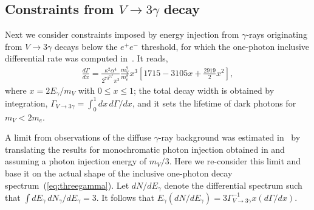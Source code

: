 \documentclass[prd,reprint,nofootinbib,notitlepage,aps,tightenlines,preprintnumbers,amsmath,amssymb,showpacs,superscriptaddress]{revtex4-1}
\begin{document}
\subsection{Constraints from $V\to 3\gamma$ decay}
\label{sec:constraints-from-vto}


Next we consider constraints imposed by energy injection from
$\gamma$-rays originating from $V\to 3\gamma$ decays below the
$e^+e^-$ threshold, for which the one-photon inclusive differential
rate was computed in~\cite{Pospelov:2008jk}. It reads,
%
\begin{align}
\label{eq:threegamma}
  \frac{d\Gamma}{dx} = \frac{\kappa^2\alpha^4}{2^73^75^3\pi^3}
 \frac{m_V^9}{m_e^8} x^3 \left[ 1715 - 3105x + \frac{2919}{2} x^2 \right],
\end{align}
%
where $x = 2 E_{\gamma}/m_V$ with $0\leq x \leq 1$; the total decay
width is obtained by integration,
$\Gamma_{V\to 3\gamma} = \int_0^1 dx\, d\Gamma/dx$, and it sets the
lifetime of dark photons for $m_V < 2m_e$. 

A limit from observations of the diffuse $\gamma$-ray background was
estimated in~\cite{Redondo:2008ec} by translating the results for
monochromatic photon injection obtained in \cite{Yuksel:2007dr} and
assuming a photon injection energy of $m_V/3$. Here we re-consider
this limit and base it on the actual shape of the inclusive one-photon
decay spectrum~(\ref{eq:threegamma}). Let $dN/dE_{\gamma}$ denote the
differential spectrum such that
$\int dE_{\gamma} \, dN_{\gamma}/dE_{\gamma} = 3$. It follows that
$E_{\gamma} (dN/dE_{\gamma}) = 3 \Gamma_{V\to 3\gamma}^{-1} x
(d\Gamma/dx )$.
\end{document}
